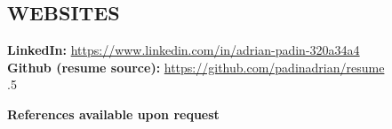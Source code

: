 \documentclass[margin,11pt]{res}
\begin{document}
\begin{resume}
\section{WEBSITES}
\textbf{LinkedIn:}
\href{https://www.linkedin.com/in/adrian-padin-320a34a4}{https://www.linkedin.com/in/adrian-padin-320a34a4}\\
\textbf{Github (resume source):}
\href{https://github.com/padinadrian/resume}{https://github.com/padinadrian/resume}\\

\vspace{10pt}
\moveleft.5\hoffset\centerline{\large\bf References available upon request}

\end{resume}
\end{document}
